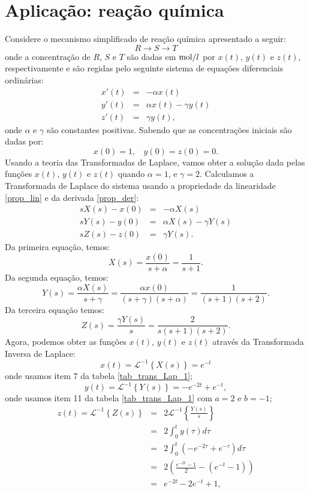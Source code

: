 \section{Aplicação: reação química}
Considere o mecanismo simplificado de reação química apresentado a seguir:
$$R\longrightarrow S \longrightarrow T$$
onde a concentração de $R$, $S$ e $T$ são dadas em $\hbox{mol}/l$ por $x(t)$, $y(t)$ e $z(t)$, respectivamente e são regidas pelo seguinte sistema de equações diferenciais ordinárias:
\begin{eqnarray*}
x'(t)&=&-\alpha x(t) \\
y'(t)&=&\alpha x(t)-\gamma y(t)\\
z'(t)&=&\gamma y(t),
\end{eqnarray*} 
onde $\alpha$ e $\gamma$ são constantes positivas. Sabendo que as concentrações iniciais são dadas por:
$$x(0)=1,~~~~ y(0)=z(0)=0.$$
Usando a teoria das Transformadas de Laplace, vamos obter a solução dada pelas funções $x(t)$, $y(t)$ e $z(t)$ quando $\alpha=1$, e $\gamma=2$. Calculamos a Transformada de Laplace do sistema usando a propriedade da linearidade \ref{prop_lin} e da derivada \ref{prop_der}:
\begin{eqnarray*}
sX(s)-x(0)&=&-\alpha X(s) \\
sY(s)-y(0)&=&\alpha X(s)-\gamma Y(s)\\
sZ(s)-z(0)&=&\gamma Y(s).
\end{eqnarray*} 
Da primeira equação, temos:
\begin{equation}
\label{eqX}X(s)=\frac{x(0)}{s+\alpha}=\frac{1}{s+1}.
\end{equation}
Da segunda equação, temos:
$$
Y(s)=\frac{\alpha X(s)}{s+\gamma}=\frac{\alpha x(0) }{(s+\gamma)(s+\alpha)}=\frac{1}{(s+1)(s+2)}.
$$
Da terceira equação temos:
$$
Z(s)=\frac{\gamma Y(s)}{s}=\frac{2}{s(s+1)(s+2)}.
$$
Agora, podemos obter as funções $x(t)$, $y(t)$ e $z(t)$ através da Transformada Inversa de Laplace:
$$
x(t)=\mathcal{L}^{-1}\left\{X(s)\right\}=e^{-t}
$$
onde usamos item 7 da tabela \ref{tab_trans_Lap_1};
$$
y(t)=\mathcal{L}^{-1}\left\{Y(s)\right\}=-e^{-2t}+e^{-t},
$$
onde usamos item 11 da tabela \ref{tab_trans_Lap_1} com $a=2$ e $b=-1$;
\begin{eqnarray*}
z(t)=\mathcal{L}^{-1}\left\{Z(s)\right\}&=&2\mathcal{L}^{-1}\left\{\frac{Y(s)}{s}\right\}\\&=&2\int_0^ty(\tau)d\tau\\
&=&2\int_0^t\left(-e^{-2\tau}+e^{-\tau}\right)d\tau\\&=&2\left(\frac{e^{-2t}-1}{2}-\left(e^{-t}-1\right)\right)\\&=&e^{-2t}-2e^{-t}+1,
\end{eqnarray*}
